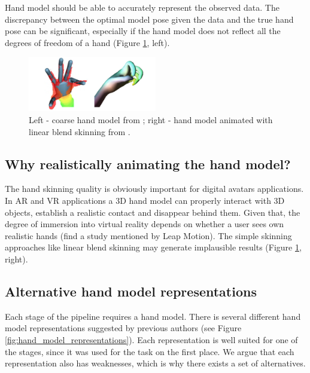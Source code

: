 \documentclass[10pt,journal,a4paper]{IEEEtran}
\begin{document}
Hand model should be able to accurately represent the observed data.  The discrepancy between the optimal model pose given the data and the true hand pose can be significant, especially if the hand model does not reflect all the degrees of freedom of a hand (Figure \ref{fig:coarse_hand_model_and_lbs}, left).


\begin{figure}[h!] 
	\centering
	\hspace{-2em}
	\includegraphics[width=0.5\textwidth]{figures/coarse_hand_model_and_lbs}
	\caption{Left - coarse hand model  from \cite{tagliasacchi2015robust}; right - hand model animated with linear blend skinning from \cite{sharp2015accurate}.}
	\label{fig:coarse_hand_model_and_lbs}
\end{figure}


\subsection{Why realistically animating the hand model?}

The hand skinning quality is obviously important for digital avatars applications. In AR and VR applications a 3D hand model can properly interact with 3D objects, establish a realistic contact and disappear behind them. Given that, the degree of immersion into virtual reality depends on whether a user sees own realistic hands \textcolor{mygray}{(find a study mentioned by Leap Motion).} The simple skinning approaches like linear blend skinning may generate implausible results  (Figure \ref{fig:coarse_hand_model_and_lbs}, right).

\subsection{Alternative hand model representations}
Each stage of the pipeline requires a hand model. There is several different hand model representations suggested by previous authors (see Figure \ref{fig:hand_model_representations}). Each representation is well suited for one of the stages, since it was used for the task on the first place. We argue that each representation also has weaknesses, which is why there exists a set of alternatives.
\end{document}
